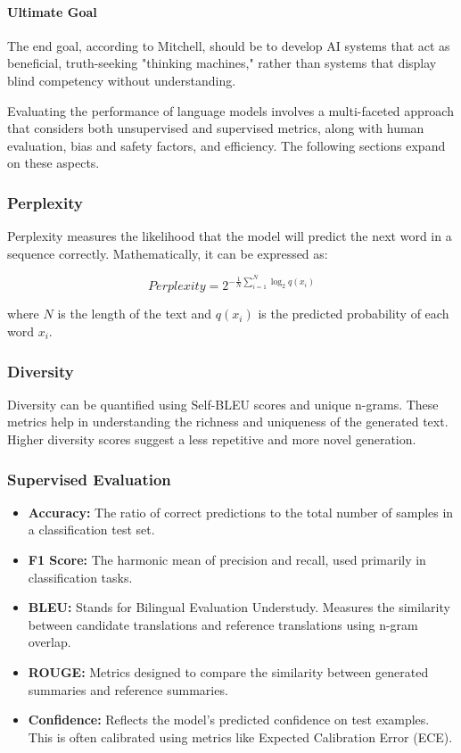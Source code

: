 \paragraph{Ultimate Goal}
The end goal, according to Mitchell, should be to develop AI systems that act as beneficial, truth-seeking "thinking machines," rather than systems that display blind competency without understanding.


Evaluating the performance of language models involves a multi-faceted approach that considers both unsupervised and supervised metrics, along with human evaluation, bias and safety factors, and efficiency. The following sections expand on these aspects.

\subsubsection{Perplexity}

Perplexity measures the likelihood that the model will predict the next word in a sequence correctly. Mathematically, it can be expressed as:

\[
{Perplexity} = 2^{-\frac{1}{N}\sum_{i=1}^{N}\log_2 q(x_i)}
\]

where \( N \) is the length of the text and \( q(x_i) \) is the predicted probability of each word \( x_i \).

\subsubsection{Diversity}

Diversity can be quantified using Self-BLEU scores and unique n-grams. These metrics help in understanding the richness and uniqueness of the generated text. Higher diversity scores suggest a less repetitive and more novel generation.

\subsubsection{Supervised Evaluation}

\begin{itemize}
    \item \textbf{Accuracy:} The ratio of correct predictions to the total number of samples in a classification test set.
    \item \textbf{F1 Score:} The harmonic mean of precision and recall, used primarily in classification tasks.
    \item \textbf{BLEU:} Stands for Bilingual Evaluation Understudy. Measures the similarity between candidate translations and reference translations using n-gram overlap.
    \item \textbf{ROUGE:} Metrics designed to compare the similarity between generated summaries and reference summaries.
    \item \textbf{Confidence:} Reflects the model's predicted confidence on test examples. This is often calibrated using metrics like Expected Calibration Error (ECE).
\end{itemize}

